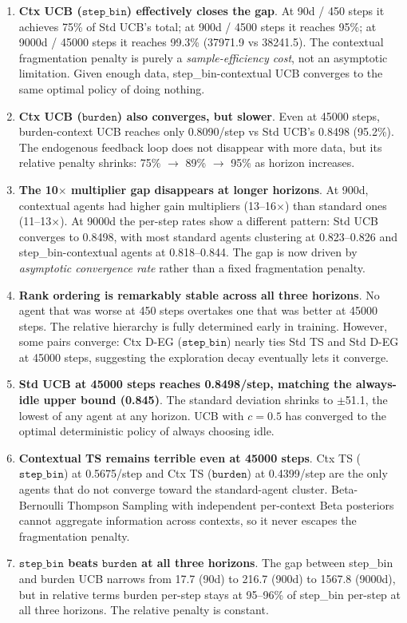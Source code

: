 \documentclass[11pt]{article}
\begin{document}
\begin{enumerate}
  \item \textbf{Ctx UCB ($\texttt{step\_bin}$) effectively closes the gap}. At 90d / 450 steps it achieves 75\% of Std UCB's total; at 900d / 4500 steps it reaches 95\%; at 9000d / 45000 steps it reaches 99.3\% (37971.9 vs 38241.5). The contextual fragmentation penalty is purely a \emph{sample-efficiency cost}, not an asymptotic limitation. Given enough data, step\_bin-contextual UCB converges to the same optimal policy of doing nothing.

  \item \textbf{Ctx UCB ($\texttt{burden}$) also converges, but slower}. Even at 45000 steps, burden-context UCB reaches only 0.8090/step vs Std UCB's 0.8498 (95.2\%). The endogenous feedback loop does not disappear with more data, but its relative penalty shrinks: 75\% $\to$ 89\% $\to$ 95\% as horizon increases.

  \item \textbf{The 10$\times$ multiplier gap disappears at longer horizons}. At 900d, contextual agents had higher gain multipliers (13--16$\times$) than standard ones (11--13$\times$). At 9000d the per-step rates show a different pattern: Std UCB converges to 0.8498, with most standard agents clustering at 0.823--0.826 and step\_bin-contextual agents at 0.818--0.844. The gap is now driven by \emph{asymptotic convergence rate} rather than a fixed fragmentation penalty.

  \item \textbf{Rank ordering is remarkably stable across all three horizons}. No agent that was worse at 450 steps overtakes one that was better at 45000 steps. The relative hierarchy is fully determined early in training. However, some pairs converge: Ctx D-EG ($\texttt{step\_bin}$) nearly ties Std TS and Std D-EG at 45000 steps, suggesting the exploration decay eventually lets it converge.

  \item \textbf{Std UCB at 45000 steps reaches 0.8498/step, matching the always-idle upper bound (0.845)}. The standard deviation shrinks to $\pm$51.1, the lowest of any agent at any horizon. UCB with $c=0.5$ has converged to the optimal deterministic policy of always choosing idle.

  \item \textbf{Contextual TS remains terrible even at 45000 steps}. Ctx TS ($\texttt{step\_bin}$) at 0.5675/step and Ctx TS ($\texttt{burden}$) at 0.4399/step are the only agents that do not converge toward the standard-agent cluster. Beta-Bernoulli Thompson Sampling with independent per-context Beta posteriors cannot aggregate information across contexts, so it never escapes the fragmentation penalty.

  \item \textbf{$\texttt{step\_bin}$ beats $\texttt{burden}$ at all three horizons}. The gap between step\_bin and burden UCB narrows from 17.7 (90d) to 216.7 (900d) to 1567.8 (9000d), but in relative terms burden per-step stays at 95--96\% of step\_bin per-step at all three horizons. The relative penalty is constant.
\end{enumerate}
\end{document}
